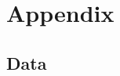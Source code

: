 \section{Appendix}
\appendix

\setcounter{figure}{0} 
\setcounter{table}{0} 


\subsection{Data}%
\label{app:data} 